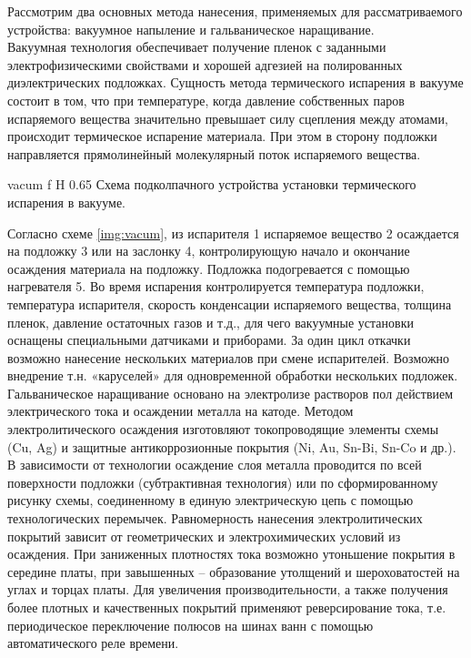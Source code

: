 \documentclass{bmstu}
\begin{document}
	\indent Рассмотрим два основных метода нанесения, применяемых для рассматриваемого устройства: вакуумное напыление и гальваническое наращивание.\\
	\indent Вакуумная технология обеспечивает получение пленок с заданными электрофизическими свойствами и хорошей адгезией на полированных диэлектрических подложках. Сущность метода термического испарения в вакууме состоит в том, что при температуре, когда давление собственных паров испаряемого вещества значительно превышает силу сцепления между атомами, происходит термическое испарение материала. При этом в сторону подложки направляется прямолинейный молекулярный поток испаряемого вещества.
	
	{vacum}
	{f} %
	{H} %
	{0.65\textwidth} %
	{Схема подколпачного устройства установки термического испарения в вакууме.} %
	
	\indent Согласно схеме \ref{img:vacum}, из испарителя 1 испаряемое вещество 2 осаждается на подложку 3 или на заслонку 4, контролирующую начало и окончание осаждения материала на подложку. Подложка подогревается с помощью нагревателя 5. Во время испарения контролируется температура подложки, температура испарителя, скорость конденсации испаряемого вещества, толщина пленок, давление остаточных газов и т.д., для чего вакуумные установки оснащены специальными датчиками и приборами. За один цикл откачки возможно нанесение нескольких материалов при смене испарителей. Возможно внедрение т.н. «каруселей» для одновременной обработки нескольких подложек.\\
	\indent Гальваническое наращивание основано на электролизе растворов пол действием электрического тока и осаждении металла на катоде. Методом электролитического осаждения изготовляют токопроводящие элементы схемы (Cu, Ag) и защитные антикоррозионные покрытия (Ni, Au, Sn-Bi, Sn-Co и др.).\\
	\indent В зависимости от технологии осаждение слоя металла проводится по всей поверхности подложки (субтрактивная технология) или по сформированному рисунку схемы, соединенному в единую электрическую цепь с помощью технологических перемычек. Равномерность нанесения электролитических покрытий зависит от геометрических и электрохимических условий из осаждения. При заниженных плотностях тока возможно утоньшение покрытия в середине платы, при завышенных – образование утолщений и шероховатостей на углах и торцах платы. Для увеличения производительности, а также получения более плотных и качественных покрытий применяют реверсирование тока, т.е. периодическое переключение полюсов на шинах ванн с помощью автоматического реле времени. 
	
\end{document}

